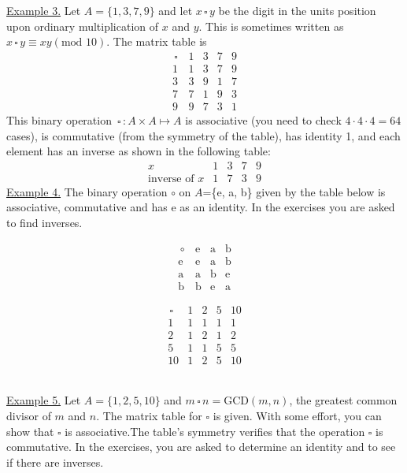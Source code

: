 \documentclass[12pt]{book}
\theoremstyle{definition}
\begin{document}
\underline{Example 3.} Let $A=\{1,3,7,9\}$ and let $x\,\square\, y$ be the digit in the units position upon ordinary multiplication of $x$ and $y$.  This is sometimes written as $x\,\square\, y \equiv xy(\text{mod }10)$.  The matrix table is
$$\begin{array}{c|cccc}
\,\square\, & 1 & 3 & 7 & 9\\
\hline
1 & 1 & 3 & 7& 9\\
3 & 3 & 9 & 1& 7\\
7 & 7 & 1 & 9 & 3\\
9 & 9 & 7 & 3 & 1
\end{array}$$
This binary operation $\,\square\,:A\times A\mapsto A$ is associative (you need to check $4\cdot4\cdot4=64$ cases), is commutative (from the symmetry of the table), has identity 1, and each element has an inverse as shown in the following table:
$$\begin{array}{c|cccc}
x & 1 & 3 & 7 & 9\\
\hline
\text{inverse of }x & 1 & 7 & 3 & 9
\end{array}$$%
%
\underline{Example 4.} The binary operation $\circ$ on $A$=\{e, a, b\} given by the table below is associative, commutative and has e as an identity.  In the exercises you are asked to find inverses.\\
\begin{minipage}{2in}
$$\begin{array}{c|ccc}
\,\circ\, & \text{e} &\text{a} & \text{b}\\
\hline
\text{e} & \text{e} & \text{a} & \text{b}\\
\text{a} & \text{a} & \text{b} & \text{e}\\
\text{b} & \text{b} & \text{e} & \text{a}
\end{array}$$
\end{minipage}
\begin{minipage}{3.5in}
$$\begin{array}{c|cccc}
\,\square\, & 1 & 2 & 5& 10\\
\hline
1 & 1 & 1 & 1 &1\\
2 & 1 & 2 & 1 & 2\\
5 & 1 & 1 & 5 & 5\\
10 & 1 & 2 & 5 & 10
\end{array}$$
\end{minipage}\\[.1in]
\underline{Example 5.}  Let $A=\{1,2,5,10\}$ and $m\,\square\, n = \text{GCD}(m,n)$, the greatest common divisor of $m$ and $n$.  The matrix table for $\square$ is given.  With some effort, you can show that $\square$ is associative.The table's symmetry verifies that the operation $\square$ is commutative.  In the exercises, you are asked to determine an identity and to see if there are inverses.\\[.1in]
\end{document}

